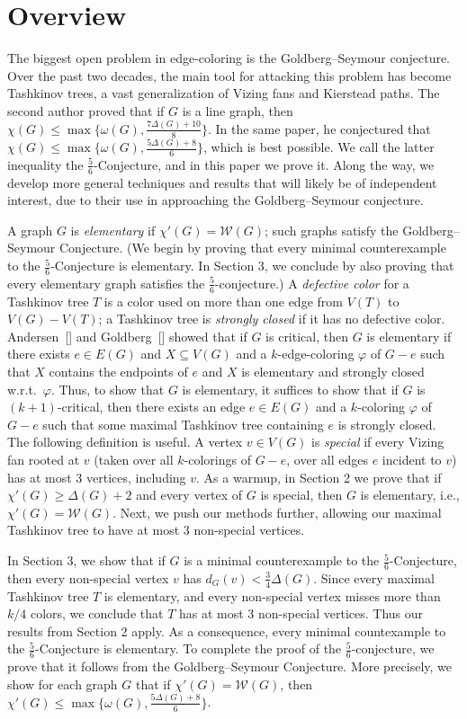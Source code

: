 \documentclass[12pt]{amsart}
\theoremstyle{plain}
\theoremstyle{definition}
\theoremstyle{remark}
\newcommand{\fancy}[1]{\mathcal{#1}}
\newcommand{\W}{\fancy{W}}
\newcommand{\vph}{\varphi}
\begin{document}
\section{Overview}

The biggest open problem in edge-coloring is the Goldberg--Seymour conjecture.
Over the past two decades, the main tool for attacking this problem has become
Tashkinov trees, a vast generalization of Vizing fans and Kierstead paths.
The second author proved that if $G$ is a line graph, then $\chi(G)\le
\max\{\omega(G),\frac{7\Delta(G)+10}{8}\}$.  In the same paper, he conjectured
that $\chi(G)\le \max\{\omega(G),\frac{5\Delta(G)+8}{6}\}$, which is best possible.
We call the latter inequality the $\frac56$-Conjecture, and in this paper we prove
it.  Along the way, we develop more general techniques and results that will
likely be of independent interest, due to their use in approaching the
Goldberg--Seymour conjecture.

A graph $G$ is \emph{elementary} if $\chi'(G)=\W(G)$; such graphs satisfy the
Goldberg--Seymour Conjecture.  (We begin by proving that every minimal
counterexample to the $\frac56$-Conjecture is elementary.  In Section 3, we conclude
by also proving that every elementary graph satisfies the $\frac56$-conjecture.)  A
\emph{defective color}
for a Tashkinov tree $T$ is a color used on more than one edge from $V(T)$ to
$V(G)-V(T)$; a Tashkinov tree is \emph{strongly closed} if it has no defective
color.  Andersen~[] and Goldberg~[] showed that if $G$ is critical, then $G$ is
elementary if there exists $e\in E(G)$ and $X\subseteq V(G)$ and a
$k$-edge-coloring $\vph$ of $G-e$ such that $X$ contains the endpoints of $e$
and $X$ is elementary and strongly closed w.r.t.~$\vph$.  Thus, to show that $G$
is elementary, it suffices to show that if $G$ is $(k+1)$-critical, then there
exists an edge $e\in E(G)$ and a $k$-coloring $\vph$ of $G-e$ such that some
maximal Tashkinov tree containing $e$ is strongly closed.  The following
definition is useful.  
A vertex $v \in V(G)$ is \emph{special} if every Vizing fan rooted at $v$ (taken over all
$k$-colorings of $G-e$, over all edges $e$ incident to $v$) has at most 3 vertices,
including $v$.
As a warmup, in Section 2 we prove that if $\chi'(G)\ge \Delta(G)+2$ and every
vertex of $G$ is special, then $G$ is elementary, i.e., $\chi'(G)=\W(G)$.  Next,
we push our methods further, allowing our maximal Tashkinov tree to have at most
3 non-special vertices.

In Section 3, we show that if $G$ is a minimal counterexample to the
$\frac56$-Conjecture, then every non-special vertex $v$ has
$d_G(v)<\frac34\Delta(G)$.  Since every maximal Tashkinov tree $T$ is
elementary, and every non-special vertex misses more than $k/4$ colors, we
conclude that $T$ has at most 3 non-special vertices.  Thus our results from
Section 2 apply.  As a consequence, every minimal countexample to the
$\frac56$-Conjecture is elementary.  To complete the proof of the $\frac56$-conjecture,
we prove that it follows from the Goldberg--Seymour Conjecture.  More precisely,
we show for each graph $G$ that if $\chi'(G)=\W(G)$, then
$\chi'(G)\le\max\{\omega(G),\frac{5\Delta(G)+8}6\}$.
\end{document}
